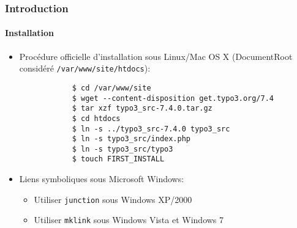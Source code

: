 \begin{frame}[fragile]
	\frametitle{Introduction}
	\framesubtitle{Installation}

	\begin{itemize}
		\item Procédure officielle d'installation sous Linux/Mac OS X\newline
			(DocumentRoot considéré \texttt{/var/www/site/htdocs}):
		\begin{lstlisting}
			$ cd /var/www/site
			$ wget --content-disposition get.typo3.org/7.4
			$ tar xzf typo3_src-7.4.0.tar.gz
			$ cd htdocs
			$ ln -s ../typo3_src-7.4.0 typo3_src
			$ ln -s typo3_src/index.php
			$ ln -s typo3_src/typo3
			$ touch FIRST_INSTALL
		\end{lstlisting}

		\item Liens symboliques sous Microsoft Windows:

			\begin{itemize}
				\item Utiliser \texttt{junction} sous Windows XP/2000
				\item Utiliser \texttt{mklink} sous Windows Vista et Windows 7
			\end{itemize}

	\end{itemize}
\end{frame}

